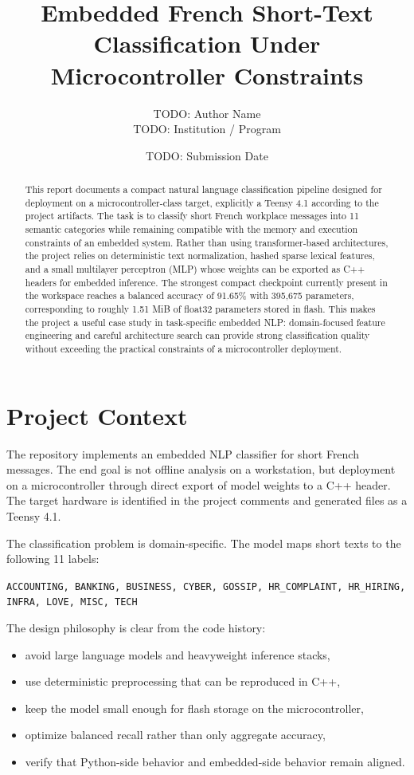 \documentclass[11pt,a4paper]{article}
\title{Embedded French Short-Text Classification Under Microcontroller Constraints}
\author{
    TODO: Author Name \\
    TODO: Institution / Program
}
\date{TODO: Submission Date}
\begin{document}
\maketitle

\begin{abstract}
This report documents a compact natural language classification pipeline designed for deployment on a microcontroller-class target, explicitly a Teensy 4.1 according to the project artifacts. The task is to classify short French workplace messages into 11 semantic categories while remaining compatible with the memory and execution constraints of an embedded system. Rather than using transformer-based architectures, the project relies on deterministic text normalization, hashed sparse lexical features, and a small multilayer perceptron (MLP) whose weights can be exported as C++ headers for embedded inference. The strongest compact checkpoint currently present in the workspace reaches a balanced accuracy of 91.65\% with 395{,}675 parameters, corresponding to roughly 1.51 MiB of float32 parameters stored in flash. This makes the project a useful case study in task-specific embedded NLP: domain-focused feature engineering and careful architecture search can provide strong classification quality without exceeding the practical constraints of a microcontroller deployment.
\end{abstract}

\section{Project Context}

The repository implements an embedded NLP classifier for short French messages. The end goal is not offline analysis on a workstation, but deployment on a microcontroller through direct export of model weights to a C++ header. The target hardware is identified in the project comments and generated files as a Teensy 4.1.

The classification problem is domain-specific. The model maps short texts to the following 11 labels:

\begin{center}
\texttt{ACCOUNTING, BANKING, BUSINESS, CYBER, GOSSIP, HR\_COMPLAINT, HR\_HIRING, INFRA, LOVE, MISC, TECH}
\end{center}

The design philosophy is clear from the code history:

\begin{itemize}
    \item avoid large language models and heavyweight inference stacks,
    \item use deterministic preprocessing that can be reproduced in C++,
    \item keep the model small enough for flash storage on the microcontroller,
    \item optimize balanced recall rather than only aggregate accuracy,
    \item verify that Python-side behavior and embedded-side behavior remain aligned.
\end{itemize}
\end{document}
